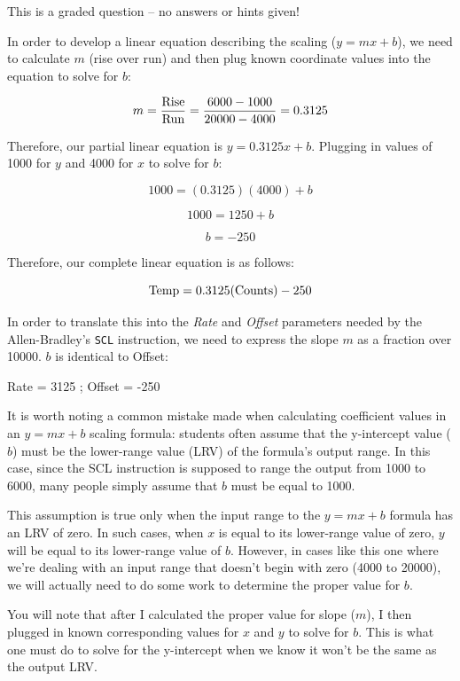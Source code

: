 \vskip 50pt

\vfil 

\eject






This is a graded question -- no answers or hints given!







In order to develop a linear equation describing the scaling ($y = mx + b$), we need to calculate $m$ (rise over run) and then plug known coordinate values into the equation to solve for $b$:

$$m = {\hbox{Rise} \over \hbox{Run}} = {6000 - 1000 \over 20000 - 4000} = 0.3125$$

Therefore, our partial linear equation is $y = 0.3125 x + b$.  Plugging in values of 1000 for $y$ and 4000 for $x$ to solve for $b$:

$$1000 = (0.3125)(4000) + b$$

$$1000 = 1250 + b$$

$$b = -250$$

Therefore, our complete linear equation is as follows:

$$\hbox{Temp} = 0.3125(\hbox{Counts}) - 250$$

\vskip 30pt

In order to translate this into the {\it Rate} and {\it Offset} parameters needed by the Allen-Bradley's {\tt SCL} instruction, we need to express the slope $m$ as a fraction over 10000.  $b$ is identical to Offset:

\vskip 10pt

Rate = 3125 ; Offset = -250

\vskip 10pt

It is worth noting a common mistake made when calculating coefficient values in an $y = mx + b$ scaling formula: students often assume that the y-intercept value ($b$) must be the lower-range value (LRV) of the formula's output range.  In this case, since the SCL instruction is supposed to range the output from 1000 to 6000, many people simply assume that $b$ must be equal to 1000.

This assumption is true only when the input range to the $y = mx + b$ formula has an LRV of zero.  In such cases, when $x$ is equal to its lower-range value of zero, $y$ will be equal to its lower-range value of $b$.  However, in cases like this one where we're dealing with an input range that doesn't begin with zero (4000 to 20000), we will actually need to do some work to determine the proper value for $b$.

You will note that after I calculated the proper value for slope ($m$), I then plugged in known corresponding values for $x$ and $y$ to solve for $b$.  This is what one must do to solve for the y-intercept when we know it won't be the same as the output LRV.




